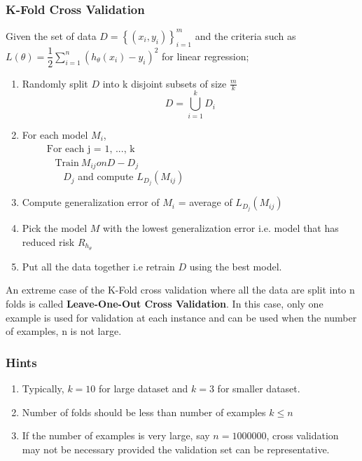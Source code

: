 \documentclass[12pt,a4paper,titlepage,landscape]{book}
\begin{document}
	\subsubsection{K-Fold Cross Validation}
	Given the set of data $D = \left\{(x_i, y_i)\right\}_{i=1}^m$ and the criteria such as $L(\theta) = \dfrac{1}{2}\sum_{i=1}^{n}\left(h_\theta(x_i) - y_i\right)^2$ for linear regression;
	\begin{enumerate}
		\item Randomly split $D$ into k disjoint subsets of size $\frac{m}{k}$
		$$D = \bigcup\limits_{i=1}^{k}D_i$$
		\item For each model $M_i$, \\
		${}\hspace{30pt} \text{For each j = 1, ..., k}$ \\
		${}\hspace{40pt}  \text{Train}~ M_{ij} on D - D_j$ \\
		${}\hspace{40pt}$  ~$D_j$ and compute $L_{D_j}(M_{ij})$
		\item Compute generalization error of $M_i$ = average of $L_{D_j}(M_{ij})$
		\item Pick the model $M$ with the lowest generalization error i.e. model that has reduced risk $R_{h_\theta}$
		\item Put all the data together i.e retrain $D$ using the best model.
	\end{enumerate}

	An extreme case of the K-Fold cross validation where all the data are split into n folds is called \textbf{Leave-One-Out Cross Validation}. In this case, only one example is used for validation at each instance and can be used when the number of examples, n is not large.\\
	
	\subsubsection{Hints}
	\begin{enumerate}
		\item Typically, $k = 10$ for large dataset and $k = 3$ for smaller dataset.
		\item Number of folds should be less than number of examples $k \leq n$
		\item If the number of examples is very large, say $n  = 1000000$, cross validation may not be necessary provided the validation set can be representative.
		
	\end{enumerate}
	
\end{document}
